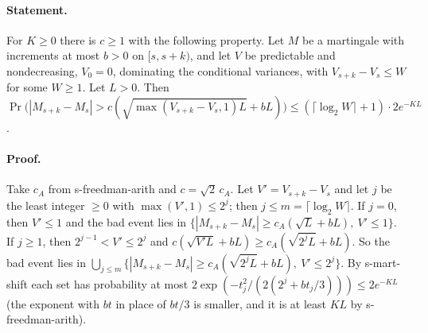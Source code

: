\paragraph{Statement.} For $K\geq0$ there is $c\geq1$ with the following property. Let $M$ be a martingale
with increments at most $b>0$ on $[s,s+k)$, and let $V$ be predictable and nondecreasing, $V_0=0$,
dominating the conditional variances, with $V_{s+k}-V_s\leq W$ for some $W\geq1$. Let $L>0$. Then
$\Pr\bigl(|M_{s+k}-M_s|>c(\sqrt{\max(V_{s+k}-V_s,1)L}+bL)\bigr)\leq(\lceil\log_2W\rceil+1)\cdot2e^{-KL}$.
\paragraph{Proof.} Take $c_A$ from s-freedman-arith and $c=\sqrt2\,c_A$. Let $V'=V_{s+k}-V_s$ and let $j$
be the least integer $\geq0$ with $\max(V',1)\leq2^j$; then $j\leq m=\lceil\log_2W\rceil$. If $j=0$, then
$V'\leq1$ and the bad event lies in $\{|M_{s+k}-M_s|\geq c_A(\sqrt L+bL),\ V'\leq1\}$. If $j\geq1$, then
$2^{j-1}<V'\leq2^j$ and $c(\sqrt{V'L}+bL)\geq c_A(\sqrt{2^jL}+bL)$. So the bad event lies in
$\bigcup_{j\leq m}\{|M_{s+k}-M_s|\geq c_A(\sqrt{2^jL}+bL),\ V'\leq2^j\}$. By s-mart-shift each set has
probability at most $2\exp(-t_j^2/(2(2^j+bt_j/3)))\leq2e^{-KL}$ (the exponent with $bt$ in place of $bt/3$ is
smaller, and it is at least $KL$ by s-freedman-arith).
